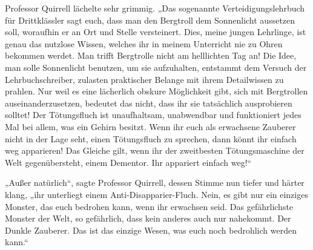 Professor Quirrell lächelte sehr grimmig. „Das sogenannte Verteidigungslehrbuch für Drittklässler sagt euch, dass man den Bergtroll dem Sonnenlicht aussetzen soll, woraufhin er an Ort und Stelle versteinert. Dies, meine jungen Lehrlinge, ist genau das nutzlose Wissen, welches ihr in meinem Unterricht nie zu Ohren bekommen werdet. Man trifft Bergtrolle nicht am helllichten Tag an! Die Idee, man solle Sonnenlicht benutzen, um sie aufzuhalten, entstammt dem Versuch der Lehrbuchschreiber, zulasten praktischer Belange mit ihrem Detailwissen zu prahlen. Nur weil es eine lächerlich obskure Möglichkeit gibt, sich mit Bergtrollen auseinanderzusetzen, bedeutet das nicht, dass ihr sie tatsächlich ausprobieren solltet! Der Tötungsfluch ist unaufhaltsam, unabwendbar und funktioniert jedes Mal bei allem, was ein Gehirn besitzt. Wenn ihr euch als erwachsene Zauberer nicht in der Lage seht, einen Tötungsfluch zu sprechen, dann könnt ihr einfach weg apparieren! Das Gleiche gilt, wenn ihr der zweitbesten Tötungsmaschine der Welt gegenübersteht, einem Dementor. Ihr appariert einfach weg!“

„Außer natürlich“, sagte Professor Quirrell, dessen Stimme nun tiefer und härter klang, „ihr unterliegt einem Anti-Disapparier-Fluch. Nein, es gibt nur ein einziges Monster, das euch bedrohen kann, wenn ihr erwachsen seid. Das gefährlichste Monster der Welt, so gefährlich, dass kein anderes auch nur nahekommt. Der Dunkle Zauberer. Das ist das einzige Wesen, was euch noch bedrohlich werden kann.“

